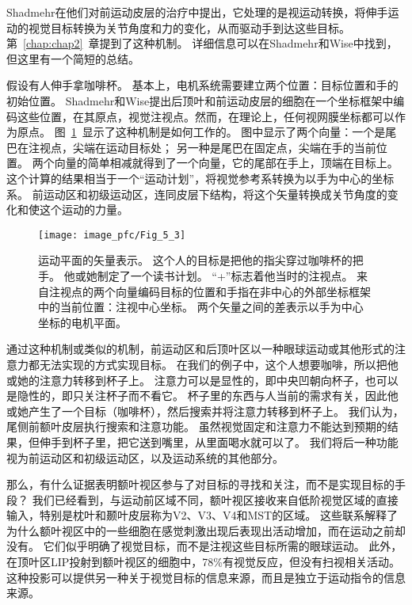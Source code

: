 Shadmehr\cite{shadmehr2004computational}在他们对前运动皮层的治疗中提出，它处理的是视运动转换，将伸手运动的视觉目标转换为关节角度和力的变化，从而驱动手到达这些目标。
第~\ref{chap:chap2}~章提到了这种机制。
详细信息可以在Shadmehr和Wise中找到，但这里有一个简短的总结。


假设有人伸手拿咖啡杯。
基本上，电机系统需要建立两个位置：目标位置和手的初始位置。
Shadmehr和Wise提出后顶叶和前运动皮层的细胞在一个坐标框架中编码这些位置，在其原点，视觉注视点。然而，在理论上，任何视网膜坐标都可以作为原点。
图~\ref{fig:5_3}~显示了这种机制是如何工作的。
图中显示了两个向量：一个是尾巴在注视点，尖端在运动目标处；
另一种是尾巴在固定点，尖端在手的当前位置。
两个向量的简单相减就得到了一个向量，它的尾部在手上，顶端在目标上。这个计算的结果相当于一个“运动计划”，将视觉参考系转换为以手为中心的坐标系。
前运动区和初级运动区，连同皮层下结构，将这个矢量转换成关节角度的变化和使这个运动的力量。


\begin{figure}
	\centering
	\texttt{[image: image\_pfc/Fig\_5\_3]}
	\caption{运动平面的矢量表示。
		这个人的目标是把他的指尖穿过咖啡杯的把手。
		他或她制定了一个读书计划。
		“+”标志着他当时的注视点。
		来自注视点的两个向量编码目标的位置和手指在非中心的外部坐标框架中的当前位置：注视中心坐标。
		两个矢量之间的差表示以手为中心坐标的电机平面\cite{shadmehr2004computational}。}
	\label{fig:5_3}
\end{figure}


通过这种机制或类似的机制，前运动区和后顶叶区以一种眼球运动或其他形式的注意力都无法实现的方式实现目标。
在我们的例子中，这个人想要咖啡，所以把他或她的注意力转移到杯子上。
注意力可以是显性的，即中央凹朝向杯子，也可以是隐性的，即只关注杯子而不看它。
杯子里的东西与人当前的需求有关，因此他或她产生了一个目标（咖啡杯），然后搜索并将注意力转移到杯子上。
我们认为，尾侧前额叶皮层执行搜索和注意功能。
虽然视觉固定和注意力不能达到预期的结果，但伸手到杯子里，把它送到嘴里，从里面喝水就可以了。
我们将后一种功能视为前运动区和初级运动区，以及运动系统的其他部分。


那么，有什么证据表明额叶视区参与了对目标的寻找和关注，而不是实现目标的手段？
我们已经看到，与运动前区域不同，额叶视区接收来自低阶视觉区域的直接输入，特别是枕叶和颞叶皮层称为V2、V3、V4和MST的区域\cite{stanton1995topography}。
这些联系解释了为什么额叶视区中的一些细胞在感觉刺激出现后表现出活动增加，而在运动之前却没有\cite{schall1991neuronal}。
它们似乎明确了视觉目标，而不是注视这些目标所需的眼球运动。
此外，在顶叶区LIP投射到额叶视区的细胞中，78\%有视觉反应，但没有扫视相关活动\cite{ferraina2002comparison}。
这种投影可以提供另一种关于视觉目标的信息来源，而且是独立于运动指令的信息来源。


